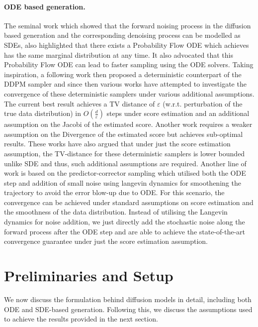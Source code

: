 \documentclass{article}
\begin{document}
\paragraph{ODE based generation.} The seminal work \cite{song2020score} which showed that the forward noising process in the diffusion based generation and the corresponding denoising process can be modelled as SDEs, also highlighted that there exists a Probability Flow ODE which achieves has the same marginal distribution at any time. It also advocated that this Probability Flow ODE can lead to faster sampling using the ODE solvers. Taking inspiration, a following work \cite{song2020denoising} then proposed a deterministic counterpart of the DDPM sampler and since then various works have attempted to investigate the convergence of these deterministic samplers \cite{li2024sharp, gao2024convergence, huang2025convergence, li2023towards, li2024unified} under various additional assumptions. The current best result \cite{li2024sharp} achieves a  TV distance of $\varepsilon$ (w.r.t. perturbation of the true data distribution) in $O(\frac{d}{\varepsilon})$ steps under score estimation and an additional assumption on the Jacobi of the estimated score. Another work \cite{li2024unified} requires a weaker assumption on the Divergence of the estimated score but achieves sub-optimal results. These works have also argued that under just the score estimation assumption, the TV-distance for these  deterministic samplers is lower bounded unlike SDE and thus, such additional assumptions are required. Another line of work is based on the predictor-corrector sampling \cite{song2020score, chen2023probability} which utilised both the ODE step and addition of small noise using langevin dynamics for smoothening the trajectory to avoid the error blow-up due to ODE. For this scenario, the convergence can be achieved \cite{chen2023probability} under standard assumptions on score estimation and the smoothness of the data distribution. Instead of utilising the Langevin dynamics for noise addition, we just directly add the stochastic noise along the forward process after the ODE step and are able to achieve the state-of-the-art convergence guarantee under just the score estimation assumption. 



\section{Preliminaries and Setup}

\noindent
We now discuss the formulation behind diffusion models in detail, including both ODE and SDE-based generation. Following this, we discuss the assumptions used to achieve the results provided in the next section.
\end{document}
